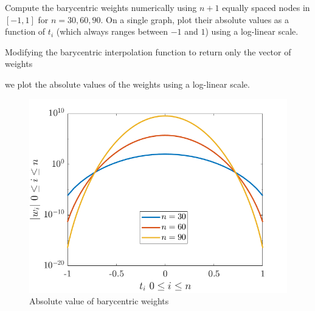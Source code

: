 \begin{statement}{4}
  Compute the barycentric weights numerically using $n + 1$ equally spaced nodes in $[-1, 1]$
  for $n = 30, 60, 90$. On a single graph, plot their absolute values as a function of $t_i$
  (which always ranges between $-1$ and $1$) using a log-linear scale.
\end{statement}

\begin{solution}
  Modifying the barycentric interpolation function to return only the vector of weights
  
  we plot the absolute values of the weights using a log-linear scale.
  
  \begin{figure}[H]
    \centering
    \includegraphics[scale=0.5]{graphics/plot-04.png}
    \caption{Absolute value of barycentric weights}
  \end{figure}
\end{solution}